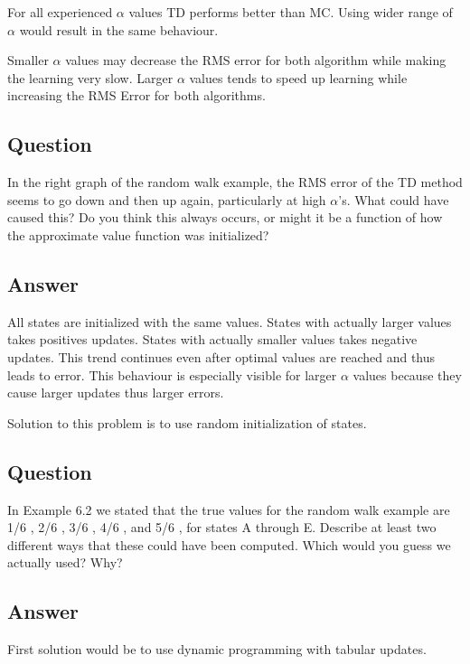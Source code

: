 \documentclass[11pt]{article}
\begin{document}
    For all experienced $\alpha$ values TD performs better than MC.
    Using wider range of $\alpha$ would result in the same behaviour.

    Smaller $\alpha$ values may decrease the RMS error for both algorithm while making the learning very slow.
    Larger $\alpha$ values tends to speed up learning while increasing the RMS Error for both algorithms.

    \subsection{Question}

    In the right graph of the random walk example, the RMS error of the TD method seems to go down and then up again, particularly at high $\alpha$’s.
    What could have caused this?
    Do you think this always occurs, or might it be a function of how the approximate value function was initialized?

    \subsection*{Answer}

    All states are initialized with the same values.
    States with actually larger values takes positives updates.
    States with actually smaller values takes negative updates.
    This trend continues even after optimal values are reached and thus leads to error.
    This behaviour is especially visible for larger $\alpha$ values because they cause larger updates thus larger errors.

    Solution to this problem is to use random initialization of states.

    \subsection{Question}

    In Example 6.2 we stated that the true values for the random walk example are 1/6 , 2/6 , 3/6 , 4/6 , and 5/6 , for states A through E.
    Describe at least two different ways that these could have been computed.
    Which would you guess we actually used?
    Why?

    \subsection*{Answer}

    First solution would be to use dynamic programming with tabular updates.
\end{document}

